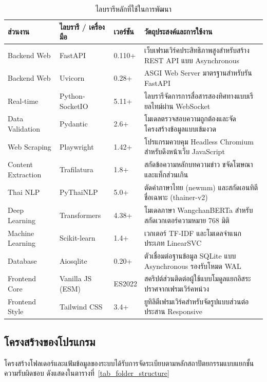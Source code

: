 \begin{table}[H]
\centering
\caption{ไลบรารีหลักที่ใช้ในการพัฒนา}
\label{tab_main_libraries}
\begin{tabularx}{\textwidth}{|L{2.2cm}|L{2.6cm}|C{1.4cm}|Y|}
\hline
\textbf{ส่วนงาน} & \textbf{ไลบรารี / เครื่องมือ} & \textbf{เวอร์ชัน} & \textbf{วัตถุประสงค์และการใช้งาน} \\
\hline
Backend Web & FastAPI & 0.110+ & เว็บเฟรมเวิร์คประสิทธิภาพสูงสำหรับสร้าง REST API แบบ Asynchronous \\ \hline
Backend Web & Uvicorn & 0.28+ & ASGI Web Server มาตรฐานสำหรับรัน FastAPI \\ \hline
Real-time & Python-SocketIO & 5.11+ & ไลบรารีจัดการการสื่อสารสองทิศทางแบบเรียลไทม์ผ่าน WebSocket \\ \hline
Data Validation & Pydantic & 2.6+ & โมเดลตรวจสอบความถูกต้องและจัดโครงสร้างข้อมูลแบบเข้มงวด \\ \hline
Web Scraping & Playwright & 1.42+ & โปรแกรมควบคุม Headless Chromium สำหรับดึงหน้าเว็บ JavaScript \\ \hline
Content Extraction & Trafilatura & 1.8+ & สกัดข้อความหลักบทความข่าว ขจัดโฆษณาและแท็กส่วนเกิน \\ \hline
Thai NLP & PyThaiNLP & 5.0+ & ตัดคำภาษาไทย (newmm) และสกัดเอนทิตีชื่อเฉพาะ (thainer-v2) \\ \hline
Deep Learning & Transformers & 4.38+ & โมเดลภาษา WangchanBERTa สำหรับสกัดเวกเตอร์ความหมาย 768 มิติ \\ \hline
Machine Learning & Scikit-learn~\parencite{scikit2024} & 1.4+ & เวกเตอร์ TF-IDF และโมเดลจำแนกประเภท LinearSVC \\ \hline
Database & Aiosqlite & 0.20+ & ตัวเชื่อมต่อฐานข้อมูล SQLite แบบ Asynchronous รองรับโหมด WAL \\ \hline
Frontend Core & Vanilla JS (ESM) & ES2022 & สคริปต์ส่วนติดต่อผู้ใช้แบบโมดูลแยกอิสระ ปราศจากเฟรมเวิร์คหน่วง \\ \hline
Frontend Style & Tailwind CSS & 3.4+ & ยูทิลิตีเฟรมเวิร์คสำหรับจัดรูปแบบส่วนต่อประสาน Responsive \\
\hline
\end{tabularx}
\end{table}

\subsection{โครงสร้างของโปรแกรม}

โครงสร้างโฟลเดอร์และแฟ้มข้อมูลของระบบได้รับการจัดระเบียบตามหลักสถาปัตยกรรมแบบแยกชั้นความรับผิดชอบ ดังแสดงในตารางที่~\ref{tab_folder_structure}

